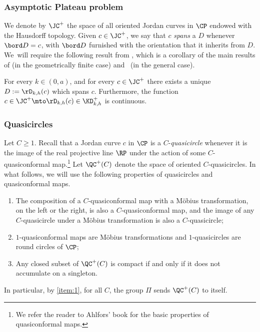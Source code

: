 \subsubsection{Asymptotic Plateau problem}\label{sss.asymptotic_Plateau_problem} We denote by $\JC^+$ the space of all oriented Jordan curves in $\CP$ endowed with the Hausdorff topology. Given $c\in\JC^+$, we say that $c$ \emph{spans} a \kdisk $D$ whenever $\bord D=c$, with $\bord D$ furnished with the orientation that it inherits from $D$. We~will require the following result from \cite[Th.\,\&\,Def.\,2.1.1]{ALS}, which is a corollary of the main results of \cite{LabourieInvent} (in the geometrically finite case) and~\cite{Smith_asymp} (in the general case).

\begin{theorem}\label{th.As_plateau_problem}
For every $k\in(0,a)$, and for every $c\in\JC^+$ there exists a unique \kdisk $D:=\rD_{k,h}(c)$ which spans $c$. Furthermore, the function $c\in\JC^+\mto\rD_{k,h}(c)\in\KD^+_{k,h}$ is continuous.
\end{theorem}

\subsubsection{Quasicircles}\label{sss.PSL_quasicircles} Let $C\geq 1$. Recall that a Jordan curve $c$ in $\CP$ is a $C$\nobreakdash-\emph{quasicircle} whenever it is the image of the real projective line $\RP$ under the action of some $C$-quasiconformal map.\footnote{We refer the reader to Ahlfors' book \cite{Ahlfors} for the basic properties of quasiconformal maps.} Let $\QC^+(C)$ denote the space of oriented $C$-quasicircles. In what follows, we will use the following properties of quasicircles and quasiconformal maps.
\begin{enumerate}
\item\label{item:1} The composition of a $C$-quasiconformal map with a Möbius transformation, on the left or the right, is also a $C$-quasiconformal map, and the image of any $C$\nobreakdash-quasi\-circle under a Möbius transformation is also a $C$-quasicircle;
\item $1$-quasiconformal maps are Möbius transformations and $1$-quasicircles are round circles of $\CP$;
\item\label{item:3} Any closed subset of $\QC^+(C)$ is compact if and only if it does not accumulate on a singleton.
\end{enumerate}
In particular, by \eqref{item:1}, for all $C$, the group $\Pi$ sends $\QC^+(C)$ to itself.

